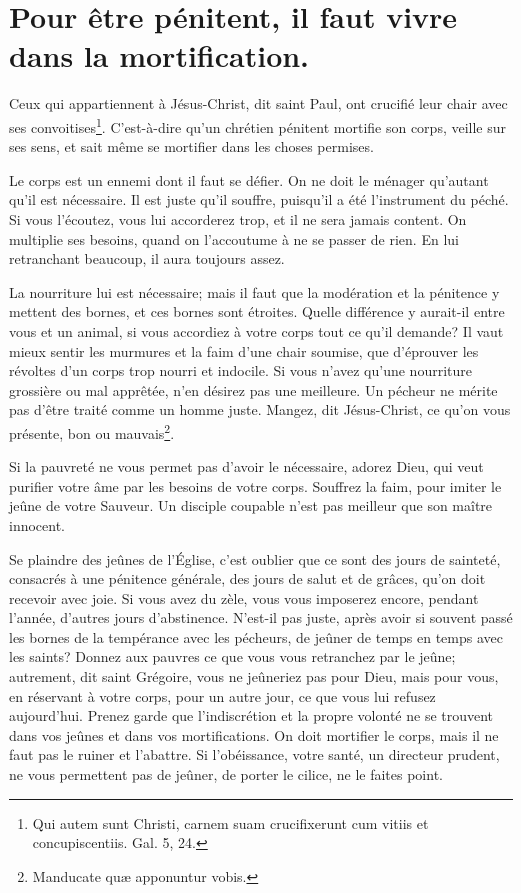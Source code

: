 \documentclass[instructions.tex]{subfiles}
\begin{document}
 
\chapter{Pour être pénitent, il faut vivre dans la mortification.}
 
Ceux qui appartiennent à Jésus-Christ, dit saint Paul, ont crucifié leur chair avec ses convoitises\footnote{Qui autem sunt Christi, carnem suam crucifixerunt cum vitiis et concupiscentiis. Gal. 5, 24.}. C’est-à-dire qu’un chrétien pénitent mortifie son corps, veille sur ses sens, et sait même se mortifier dans les choses permises.
 
\primo Le corps est un ennemi dont il faut se défier. On ne doit le ménager qu’autant qu’il est nécessaire. Il est juste qu’il souffre, puisqu’il a été l’instrument du péché. Si vous l’écoutez, vous lui accorderez trop, et il ne sera jamais content. On multiplie ses besoins, quand on l’accoutume à ne se passer de rien. En lui retranchant beaucoup, il aura toujours assez.
 
La nourriture lui est nécessaire; mais il faut que la modération et la pénitence y mettent des bornes, et ces bornes sont étroites. Quelle différence y aurait-il entre vous et un animal, si vous accordiez à votre corps tout ce qu’il demande? Il vaut mieux sentir les murmures et la faim d’une chair soumise, que d’éprouver les révoltes d’un corps trop nourri et indocile. Si vous n’avez qu’une nourriture grossière ou mal apprêtée, n’en désirez pas une meilleure. Un pécheur ne mérite pas d’être traité comme un homme juste. Mangez, dit Jésus-Christ, ce qu’on vous présente, bon ou mauvais\footnote{Manducate quæ apponuntur vobis.}.
 
Si la pauvreté ne vous permet pas d’avoir le nécessaire, adorez Dieu, qui veut purifier votre âme par les besoins de votre corps. Souffrez la faim, pour imiter le jeûne de votre Sauveur. Un disciple coupable n’est pas meilleur que son maître innocent.
 
Se plaindre des jeûnes de l’Église, c’est oublier que ce sont des jours de sainteté, consacrés à une pénitence générale, des jours de salut et de grâces, qu’on doit recevoir avec joie. Si vous avez du zèle, vous vous imposerez encore, pendant l’année, d’autres jours d’abstinence. N’est-il pas juste, après avoir si souvent passé les bornes de la tempérance avec les pécheurs, de jeûner de temps en temps avec les saints? Donnez aux pauvres ce que vous vous retranchez par le jeûne; autrement, dit saint Grégoire, vous ne jeûneriez pas pour Dieu, mais pour vous, en réservant à votre corps, pour un autre jour, ce que vous lui refusez aujourd’hui. Prenez garde que l’indiscrétion et la propre volonté ne se trouvent dans vos jeûnes et dans vos mortifications. On doit mortifier le corps, mais il ne faut pas le ruiner et l’abattre. Si l’obéissance, votre santé, un directeur prudent, ne vous permettent pas de jeûner, de porter le cilice, ne le faites point.
 
\end{document}
